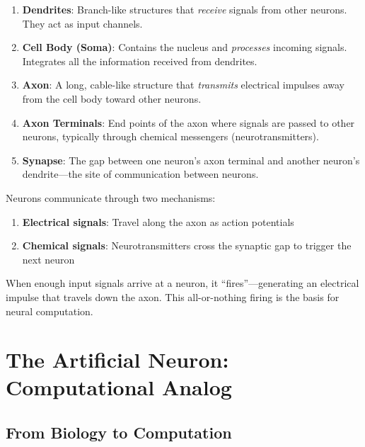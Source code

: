 \begin{enumerate}
    \item \textbf{Dendrites}: Branch-like structures that \textit{receive} signals from other neurons. They act as input channels.
    
    \item \textbf{Cell Body (Soma)}: Contains the nucleus and \textit{processes} incoming signals. Integrates all the information received from dendrites.
    
    \item \textbf{Axon}: A long, cable-like structure that \textit{transmits} electrical impulses away from the cell body toward other neurons.
    
    \item \textbf{Axon Terminals}: End points of the axon where signals are passed to other neurons, typically through chemical messengers (neurotransmitters).
    
    \item \textbf{Synapse}: The gap between one neuron's axon terminal and another neuron's dendrite---the site of communication between neurons.
\end{enumerate}

\begin{bluebox}
Neurons communicate through two mechanisms:
\begin{enumerate}
    \item \textbf{Electrical signals}: Travel along the axon as action potentials
    \item \textbf{Chemical signals}: Neurotransmitters cross the synaptic gap to trigger the next neuron
\end{enumerate}

When enough input signals arrive at a neuron, it ``fires''---generating an electrical impulse that travels down the axon. This all-or-nothing firing is the basis for neural computation.
\end{bluebox}


\section{The Artificial Neuron: Computational Analog}

\subsection{From Biology to Computation}

